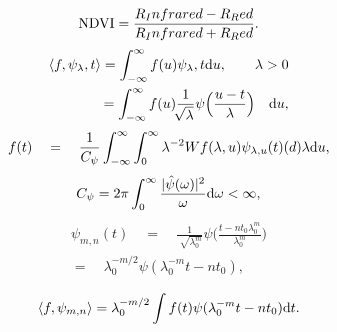 \documentclass{article}
\begin{document}
$$\textnormal{NDVI}=\frac{R_Infrared-R_Red}{R_Infrared+R_Red}.$$
\begin{eqnarray*}
\langle f,\psi_\lambda,t\rangle=\int_{-\infty}^\infty 
f(u)\psi_\lambda,t\textnormal{d}u,\qquad \lambda>0\\
=\int_{-\infty}^\infty f(u) \frac{1}{\sqrt[]{\lambda}}\psi\Big(\frac{u-t}{\lambda}\Big) \quad\textnormal{d}u,\\
\end{eqnarray*}
$$f(t)\quad=\quad\frac{1}{C_\psi}\int_{-\infty}^\infty\int_0^\infty\lambda^{-2}Wf(\lambda,u)\psi_{\lambda,u}(t)\textnormal(d)\lambda\textnormal{d}u,$$
$$C_\psi=2\pi\int_0^\infty\frac{|\hat{\psi}(\omega)|^2}{\omega}\textnormal{d}\omega<\infty,$$
\begin{eqnarray*}
\psi_{m,n}(t)\quad=\quad\frac{1}{\sqrt[]{\lambda_0^m}}\psi\Big(\frac{t-nt_0\lambda_0^m}{\lambda_0^m}\Big)\\
=\quad\lambda_0^{-m/2}\psi (\lambda_0^{-m}t-nt_0),\\
\end{eqnarray*}
$$\langle f,\psi_{m,n}\rangle=\lambda_0^{-m/2}\int f(t)\psi (\lambda_0^{-m}t-nt_0)\textnormal{d}t.$$
\end{document}

